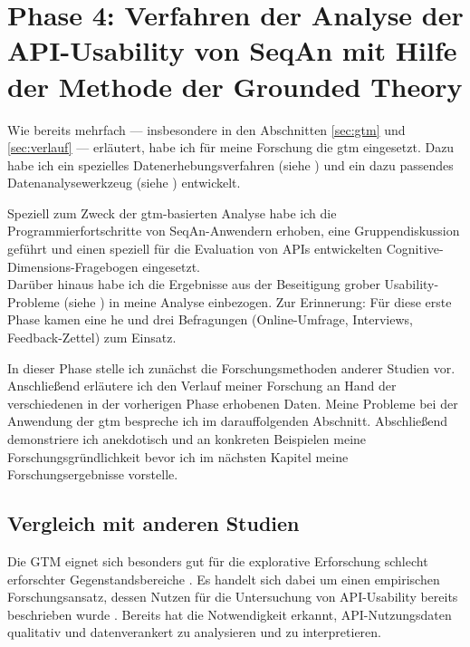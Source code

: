 \section[Phase 4: Durchführung der GTM-Datenanalyse]{Phase 4: Verfahren der Analyse der API-Usability von SeqAn mit Hilfe der Methode der Grounded Theory}
\label{sec:phase4}

Wie bereits mehrfach --- insbesondere in den Abschnitten \ref{sec:gtm} und \ref{sec:verlauf} --- erläutert, habe ich für meine Forschung die \acrfull{gtm} eingesetzt. Dazu habe ich ein spezielles Datenerhebungsverfahren (siehe ) und ein dazu passendes Datenanalysewerkzeug (siehe ) entwickelt.

Speziell zum Zweck der \gls{gtm}-basierten Analyse habe ich die Programmierfortschritte von SeqAn-Anwendern erhoben, eine Gruppendiskussion geführt und einen speziell für die Evaluation von APIs entwickelten Cognitive-Dimensions-Fragebogen eingesetzt.
\\Darüber hinaus habe ich die Ergebnisse aus der Beseitigung grober Usability-Probleme (siehe ) in meine Analyse einbezogen. Zur Erinnerung: Für diese erste Phase kamen eine \acrfull{he} und drei Befragungen (Online-Umfrage, Interviews, Feedback-Zettel) zum Einsatz.

In dieser Phase stelle ich zunächst die Forschungsmethoden anderer Studien vor. Anschließend erläutere ich den Verlauf meiner Forschung an Hand der verschiedenen in der vorherigen Phase erhobenen Daten. Meine Probleme bei der Anwendung der \gls{gtm} bespreche ich im darauffolgenden Abschnitt. Abschließend demonstriere ich anekdotisch und an konkreten Beispielen meine Forschungsgründlichkeit bevor ich im nächsten Kapitel meine Forschungsergebnisse vorstelle. 

\subsection{Vergleich mit anderen Studien}

Die GTM eignet sich besonders gut für die explorative Erforschung schlecht erforschter Gegenstandsbereiche \citep{mayring2002einfhrung}. Es handelt sich dabei um einen empirischen Forschungsansatz, dessen Nutzen für die Untersuchung von API-Usability bereits beschrieben wurde \citep{SIGCHI:2009up}. Bereits \cite{Brooks:1980kb} hat die Notwendigkeit erkannt, API-Nutzungsdaten qualitativ und datenverankert zu analysieren und zu interpretieren.

